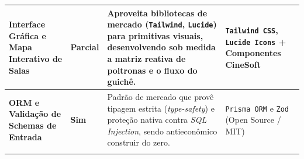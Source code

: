 {{\begin{tabularx}{\textwidth}{>{\raggedright\arraybackslash\hsize=0.88\hsize}X >{\centering\arraybackslash\hsize=0.52\hsize}X >{\raggedright\arraybackslash\hsize=1.73\hsize}X >{\raggedright\arraybackslash\hsize=0.88\hsize}X}
\textbf{Interface Gráfica e Mapa Interativo de Salas} & \textbf{Parcial} & Aproveita bibliotecas de mercado (\texttt{Tailwind}, \texttt{Lucide}) para primitivas visuais, desenvolvendo sob medida a matriz reativa de poltronas e o fluxo do guichê. & \texttt{Tailwind \allowbreak\hspace{0pt plus 1pt}CSS}, \texttt{Lucide \allowbreak\hspace{0pt plus 1pt}Icons} + Componentes CineSoft \\
\midrule
\textbf{ORM e Validação de Schemas de Entrada} & \textbf{Sim} & Padrão de mercado que provê tipagem estrita (\emph{type-safety}) e proteção nativa contra \emph{SQL Injection}, sendo antieconômico construir do zero. & \texttt{Prisma ORM} e \texttt{Zod} (Open Source / MIT) \\
\arrayrulecolor{GithubTableBorder}\bottomrule
\end{tabularx}%
}
}

